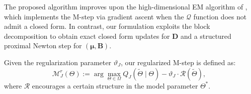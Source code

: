 \documentclass[]{report}
\theoremstyle{definition}
\begin{document}
The proposed algorithm improves upon the high-dimensional EM algorithm of \cite{wang2015highdimensionalexpectationmaximizationalgorithm}, which implements the M-step via gradient ascent when the $\mathcal{Q}$ function does not admit a closed form. In contrast, our formulation exploits the block decomposition to obtain exact closed form updates for $\mathbf{D}$ and a structured proximal Newton step for $(\bm{\mu},\mathbf{B})$.

Given the regularization parameter $\vartheta_{J}$, our regularized M-step is defined as:
\begin{equation}
    \mathcal{M}_{J}^{r}(\Theta):=\arg\max_{\Theta \in \Omega}
Q_{J}(\tilde{\Theta} \mid \Theta)-\vartheta_{J} \cdot \mathcal{R}(\tilde{\Theta}),
\end{equation}
where $\mathcal{R}$ encourages a certain structure in the model parameter $\Theta^{*}$.
\end{document}
